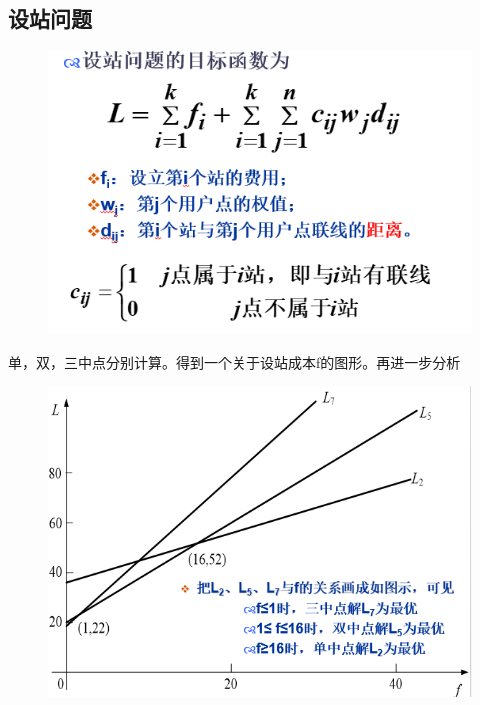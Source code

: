 \subsection{设站问题}
\begin{figure}[H]
	\centering
	\includegraphics[width=0.7\linewidth]{figures/screenshot081}
	\caption{}
	\label{fig:screenshot081}
\end{figure}
单，双，三中点分别计算。得到一个关于设站成本f的图形。再进一步分析
\begin{figure}[H]
	\centering
	\includegraphics[width=0.7\linewidth]{figures/screenshot082}
	\caption{}
	\label{fig:screenshot082}
\end{figure}








